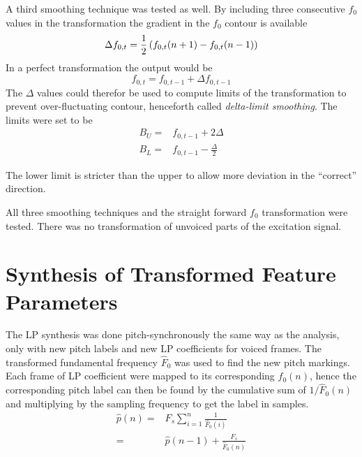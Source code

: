 A third smoothing technique was tested as well. By including three consecutive $f_0$ values in the transformation the gradient in the $f_0$ contour is available
\begin{equation}
	\Delta f_{0,t} = \frac{1}{2}\left(f_{0,t}(n+1)-f_{0,t}(n-1)\right)
\end{equation}
In a perfect transformation the output would be
\begin{equation}
	f_{0,t} = f_{0,t-1} + \Delta f_{0,t-1}
\end{equation}
The $\Delta$ values could therefor be used to compute limits of the transformation to prevent over-fluctuating contour, henceforth called \emph{delta-limit smoothing}. The limits were set to be
\begin{equation}
	\begin{split}
		B_U = & f_{0,t-1} + 2\Delta\\
		B_L = & f_{0,t-1} - \frac{\Delta}{2}
	\end{split}
\end{equation} 
\begin{remark}
	The lower limit is stricter than the upper to allow more deviation in the ``correct'' direction.
\end{remark}

All three smoothing techniques and the straight forward $f_0$ transformation were tested. There was no transformation of unvoiced parts of the excitation signal. 


\section{Synthesis of Transformed Feature Parameters} %
\label{sec:synthesis_of_transformed_feature_parameters}

The LP synthesis was done pitch-synchronously the same way as the analysis, only with new pitch labels and new LP coefficients for voiced frames. The transformed fundamental frequency $\hat{F}_0$ was used to find the new pitch markings. Each frame of LP coefficient were mapped to its corresponding $f_0(n)$, hence the corresponding pitch label can then be found by the cumulative sum of $1/\hat{F}_0(n)$ and multiplying by the sampling frequency to get the label in samples.
\begin{equation}
	\begin{split}
		\hat{p}(n) =& F_s \sum_{i=1}^{n}\frac{1}{\hat{F}_0(i)} \\
		 =& \hat{p}(n-1) + \frac{F_s}{\hat{F}_0(n)} \\
	\end{split}
\end{equation}


